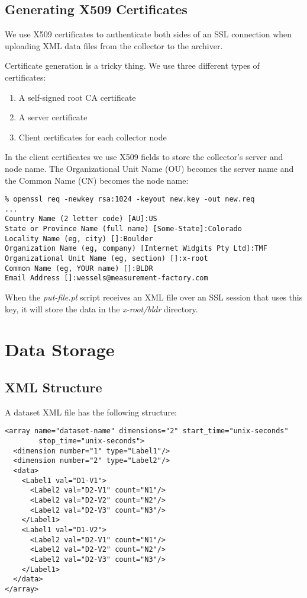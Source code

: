 \documentclass{report}
\begin{document}
\section{Generating X509 Certificates}

We use X509 certificates to authenticate both sides
of an SSL connection when uploading XML data files from 
the collector to the archiver.

Certificate generation is a tricky thing.  We use three different
types of certificates:
\begin{enumerate}
\item A self-signed root CA certificate
\item A server certificate
\item Client certificates for each collector node
\end{enumerate}

In the client certificates
we use X509 fields to store the collector's server and node name.
The Organizational Unit Name (OU) becomes the server name and
the Common Name (CN) becomes the node name:

\begin{verbatim}
% openssl req -newkey rsa:1024 -keyout new.key -out new.req
...
Country Name (2 letter code) [AU]:US
State or Province Name (full name) [Some-State]:Colorado
Locality Name (eg, city) []:Boulder
Organization Name (eg, company) [Internet Widgits Pty Ltd]:TMF
Organizational Unit Name (eg, section) []:x-root
Common Name (eg, YOUR name) []:BLDR
Email Address []:wessels@measurement-factory.com
\end{verbatim}

When the {\em put-file.pl\/} script receives an XML file over an SSL session
that uses this key, it will store the data in the {\em x-root/bldr\/} directory.

\chapter{Data Storage}

\section{XML Structure}

A dataset XML file has the following structure:

\begin{verbatim}
<array name="dataset-name" dimensions="2" start_time="unix-seconds"
        stop_time="unix-seconds">
  <dimension number="1" type="Label1"/>
  <dimension number="2" type="Label2"/>
  <data>
    <Label1 val="D1-V1">
      <Label2 val="D2-V1" count="N1"/>
      <Label2 val="D2-V2" count="N2"/>
      <Label2 val="D2-V3" count="N3"/>
    </Label1>
    <Label1 val="D1-V2">
      <Label2 val="D2-V1" count="N1"/>
      <Label2 val="D2-V2" count="N2"/>
      <Label2 val="D2-V3" count="N3"/>
    </Label1>
  </data>
</array>
\end{verbatim}
\end{document}
